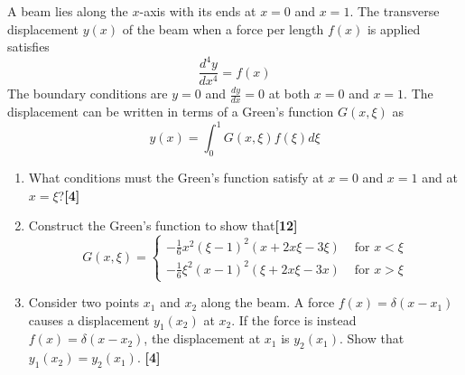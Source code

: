 \documentclass[a4paper]{article}
\begin{document}
\begin{qns}
A beam lies along the $x$-axis with its ends at $x = 0$ and $x = 1$. The transverse displacement $y(x)$ of the beam when a force per length $f(x)$ is applied satisfies
$$\frac{d^4y}{dx^4}=f(x)$$
The boundary conditions are $y = 0$ and $\frac{dy}{dx}=0$ at both $x = 0$ and $x = 1$. The displacement can be written in terms of a Green’s function $G(x,\xi)$ as
$$y(x)=\int_0^1G(x,\xi)f(\xi)d\xi$$
\begin{enumerate}[label=(\roman*)]
    \item What conditions must the Green’s function satisfy at $x = 0$ and $x = 1$ and at $x=\xi$?\hfill \textbf{[4]}
    \item Construct the Green’s function to show that\hfill \textbf{[12]}
$$G(x,\xi)=
\left\{
        \begin{array}{ll}
      -\frac{1}{6}x^2(\xi-1)^2(x+2x\xi-3\xi) & \text{ for }x<\xi \\
      -\frac{1}{6}\xi^2(x-1)^2(\xi+2x\xi-3x) & \text{ for } x>\xi
        \end{array}
    \right.$$
    \item Consider two points $x_1$ and $x_2$ along the beam. A force $f(x) =\delta (x − x_1)$ causes a
displacement $y_1(x_2)$ at $x_2$. If the force is instead $f(x) = \delta(x−x_2)$, the displacement at $x_1$ is $y_2(x_1)$. Show that $y_1(x_2) = y_2(x_1)$. \hfill \textbf{[4]}
\end{enumerate}
\end{qns}
\end{document}
